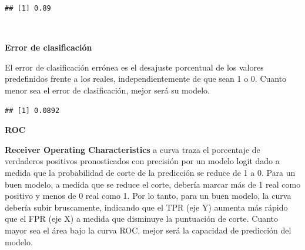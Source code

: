 \documentclass[]{book}
\newenvironment{Shaded}{\begin{snugshade}}{\end{snugshade}}
\newcommand{\KeywordTok}[1]{\textcolor[rgb]{0.13,0.29,0.53}{\textbf{#1}}}
\newcommand{\DataTypeTok}[1]{\textcolor[rgb]{0.13,0.29,0.53}{#1}}
\newcommand{\DecValTok}[1]{\textcolor[rgb]{0.00,0.00,0.81}{#1}}
\newcommand{\StringTok}[1]{\textcolor[rgb]{0.31,0.60,0.02}{#1}}
\newcommand{\OperatorTok}[1]{\textcolor[rgb]{0.81,0.36,0.00}{\textbf{#1}}}
\newcommand{\NormalTok}[1]{#1}
\begin{document}
\begin{Shaded}
\end{Shaded}

\begin{verbatim}
## [1] 0.89
\end{verbatim}

~

\textbf{Error de clasificación}

El error de clasificación errónea es el desajuste porcentual de los
valores predefinidos frente a los reales, independientemente de que sean
1 o 0. Cuanto menor sea el error de clasificación, mejor será su modelo.

\begin{Shaded}
\end{Shaded}

\begin{verbatim}
## [1] 0.0892
\end{verbatim}

\textbf{ROC}

\textbf{Receiver Operating Characteristics} a curva traza el porcentaje
de verdaderos positivos pronosticados con precisión por un modelo logit
dado a medida que la probabilidad de corte de la predicción se reduce de
1 a 0. Para un buen modelo, a medida que se reduce el corte, debería
marcar más de 1 real como positivo y menos de 0 real como 1. Por lo
tanto, para un buen modelo, la curva debería subir bruscamente,
indicando que el TPR (eje Y) aumenta más rápido que el FPR (eje X) a
medida que disminuye la puntuación de corte. Cuanto mayor sea el área
bajo la curva ROC, mejor será la capacidad de predicción del modelo.

\begin{Shaded}
\end{Shaded}
\end{document}

